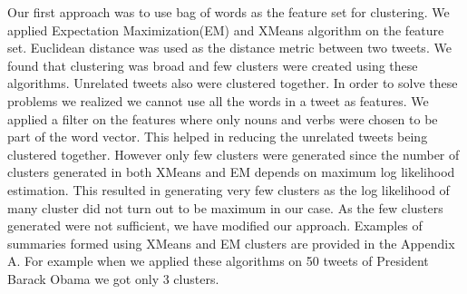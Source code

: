 Our first approach was to use bag of words as the feature set for clustering. We applied Expectation Maximization(EM)\cite{Gupta:2010:DNC:1798337.1798433} and XMeans \cite{Pelleg:2000:XEK:645529.657808} algorithm on the feature set. Euclidean distance was used as the distance metric between two tweets. We found that clustering was broad and few clusters were created using these algorithms. Unrelated tweets also were clustered together. In order to solve these problems we realized we cannot use all the words in a tweet as features. We applied a filter on the features where only nouns and verbs were chosen to be part of the word vector. This helped in reducing the unrelated tweets being clustered together. However only few clusters were generated since the number of clusters generated in both XMeans and EM depends on maximum log likelihood estimation. This resulted in generating very few clusters as the log likelihood of many cluster did not turn out to be maximum in our case. As the few clusters generated were not sufficient, we have modified our approach. Examples of summaries formed using XMeans and EM clusters are provided in the Appendix A. For example when we applied these algorithms on 50 tweets of President Barack Obama we got only 3 clusters. 

